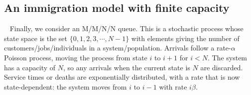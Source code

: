 {\subsection{An immigration model with finite capacity}\label{sec:immig}~
Finally, we consider an M/M/N/N queue. This is a stochastic 
process whose state space is the set $\{0, 1, 2, 3, \cdots, N - 1\}$ with 
elements giving the number of customers/jobs/individuals in a system/population. 
Arrivals follow a rate-$\alpha$ Poisson process, moving the process from state 
$i$ to $i+1$ for $i<N$. The system has a capacity of $N$, so any arrivals when 
the current state is $N$ are discarded.  Service times or deaths are 
exponentially distributed, with a rate that is now state-dependent:
the system moves from $i$ to $i - 1$ with rate $i\beta$. 

}
